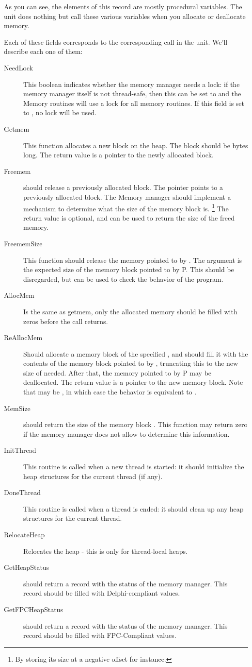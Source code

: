 As you can see, the elements of this record are mostly procedural variables.
The  unit does nothing but call these various variables when you
allocate or deallocate memory.

Each of these fields corresponds to the corresponding call in the 
unit. We'll describe each one of them:
\begin{description}
\item[NeedLock] This boolean indicates whether the memory manager needs a lock:
if the memory manager itself is not thread-safe, then this can be set to
 and the Memory routines will use a lock for all memory routines. 
If this field is set to , no lock will be used.
\item[Getmem] This function allocates a new block on the heap. The block
should be  bytes long. The return value is a pointer to the newly
allocated block.
\item[Freemem] should release a previously allocated block. The pointer
 points to a previously allocated block. The Memory manager should
implement a mechanism to determine what the size of the memory block is.
\footnote{By storing its size at a negative offset for instance.} The
return value is optional, and can be used to return the size of the freed
memory.
\item[FreememSize] This function should release the memory pointed to by
. The argument  is the expected size of the memory block
pointed to by P. This should be disregarded, but can be used to check the
behavior of the program.
\item[AllocMem] Is the same as getmem, only the allocated memory should
be filled with zeros before the call returns.
\item[ReAllocMem] Should allocate a memory block of the specified ,
and should fill it with the contents of the memory block pointed to by
, truncating this to the new size of needed. After that, the memory
pointed to by P may be deallocated. The return value is a pointer to the
new memory block. Note that  may be , in which case the
behavior is equivalent to .
\item[MemSize] should return the size of the memory block .
This function may return zero if the memory manager does not allow 
to determine this information.
\item[InitThread] This routine is called when a new thread is started:
it should initialize the heap structures for the current thread (if any).
\item[DoneThread] This routine is called when a thread is ended:
it should clean up any heap structures for the current thread.
\item[RelocateHeap] Relocates the heap - this is only for thread-local
heaps.
\item[GetHeapStatus] should return a  record with the
status of the memory manager. This record should be filled with
Delphi-compliant values.
\item[GetFPCHeapStatus] should return a  record with the
status of the memory manager. This record should be filled with
FPC-Compliant values.
\end{description}
